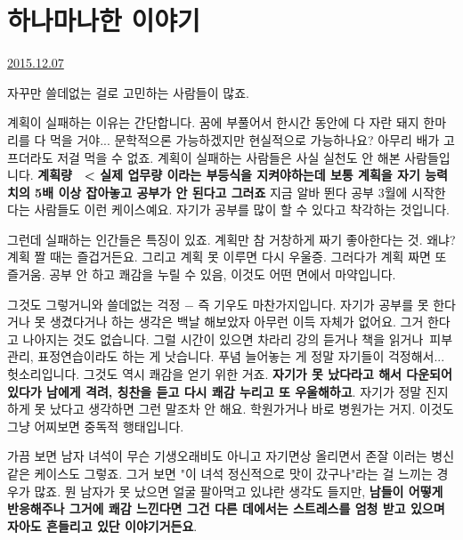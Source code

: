\section{하나마나한 이야기}
\href{https://www.kockoc.com/Apoc/531614}{2015.12.07}

\vspace{5mm}

자꾸만 쓸데없는 걸로 고민하는 사람들이 많죠.
\vspace{5mm}

계획이 실패하는 이유는 간단합니다.
꿈에 부풀어서 한시간 동안에 다 자란 돼지 한마리를 다 먹을 거야... 문학적으론 가능하겠지만 현실적으로 가능하나요?
아무리 배가 고프더라도 저걸 먹을 수 없죠.
계획이 실패하는 사람들은 사실 실천도 안 해본 사람들입니다.
\textbf{계획량  < 실제 업무량 이라는 부등식을 지켜야하는데 보통 계획을 자기 능력치의 5배 이상 잡아놓고 공부가 안 된다고 그러죠}
지금 알바 뛴다 공부 3월에 시작한다는 사람들도 이런 케이스예요.
자기가 공부를 많이 할 수 있다고 착각하는 것입니다.
\vspace{5mm}

그런데 실패하는 인간들은 특징이 있죠. 계획만 참 거창하게 짜기 좋아한다는 것.
왜냐? 계획 짤 때는 즐겁거든요. 그리고 계획 못 이루면 다시 우울증. 그러다가 계획 짜면 또 즐거움.
공부 안 하고 쾌감을 누릴 수 있음, 이것도 어떤 면에서 마약입니다.
\vspace{5mm}

그것도 그렇거니와 쓸데없는 걱정 $-$ 즉 기우도 마찬가지입니다.
자기가 공부를 못 한다거나 못 생겼다거나 하는 생각은 백날 해보았자 아무런 이득 자체가 없어요.
그거 한다고 나아지는 것도 없습니다. 그럴 시간이 있으면 차라리 강의 듣거나 책을 읽거나 피부관리, 표정연습이라도 하는 게 낫습니다.
푸념 늘어놓는 게 정말 자기들이 걱정해서... 헛소리입니다. 그것도 역시 쾌감을 얻기 위한 거죠.
\textbf{자기가 못 났다라고 해서 다운되어있다가 남에게 격려, 칭찬을 듣고 다시 쾌감 누리고 또 우울해하고}.
자기가 정말 진지하게 못 났다고 생각하면 그런 말조차 안 해요. 학원가거나 바로 병원가는 거지.
이것도 그냥 어찌보면 중독적 행태입니다.
\vspace{5mm}

가끔 보면 남자 녀석이 무슨 기생오래비도 아니고 자기면상 올리면서 존잘 이러는 병신같은 케이스도 그렇죠.
그거 보면 "이 녀석 정신적으로 맛이 갔구나"라는 걸 느끼는 경우가 많죠. 뭔 남자가 못 났으면 얼굴 팔아먹고 있냐란 생각도 들지만,
\textbf{남들이 어떻게 반응해주나 그거에 쾌감 느낀다면 그건 다른 데에서는 스트레스를 엄청 받고 있으며 자아도 흔들리고 있단 이야기거든요}.
\vspace{5mm}

